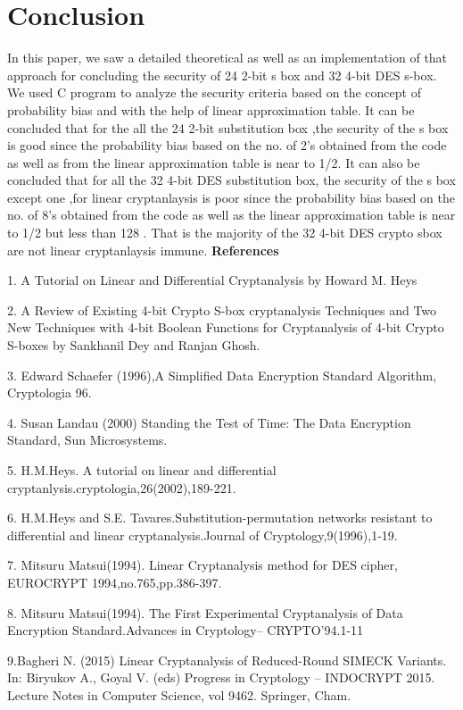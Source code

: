 \documentclass[12pt]{article}
\begin{document}
\section{Conclusion}
In this paper, we saw a detailed theoretical as well as an implementation of that approach for concluding the security of 24 2-bit s box and 32 4-bit DES s-box. We used C program to analyze the security criteria based on the concept of probability bias and with the help of linear approximation table. It can be concluded that for the all the 24 2-bit substitution box ,the security of the s box is good since the probability bias based on the no. of 2's obtained from the code as well as from the linear approximation table is near to 1/2. It can also be concluded that for all the 32 4-bit DES substitution box, the security of the s box except one ,for linear cryptanlaysis is poor since the probability bias based on the no. of 8's obtained from the code as well as the linear approximation table is near to 1/2 but less than 128 . That is the majority of the 32 4-bit DES crypto sbox are not linear cryptanlaysis immune.
\newpage
\textbf{\LARGE References}

1. A Tutorial on Linear and Differential Cryptanalysis by Howard M. Heys 

2. A Review of Existing 4-bit Crypto S-box cryptanalysis Techniques and Two New Techniques with 4-bit Boolean Functions for Cryptanalysis of 4-bit Crypto S-boxes by Sankhanil Dey and Ranjan Ghosh.

3. Edward Schaefer (1996),A Simplified Data Encryption Standard Algorithm, Cryptologia 96. 

4. Susan Landau (2000) Standing the Test of Time: The Data Encryption Standard, Sun Microsystems.

5. H.M.Heys. A tutorial on linear and differential cryptanlysis.cryptologia,26(2002),189-221.

6. H.M.Heys and S.E. Tavares.Substitution-permutation networks resistant to differential and linear cryptanalysis.Journal 
of Cryptology,9(1996),1-19.

7. Mitsuru Matsui(1994). Linear Cryptanalysis method for DES cipher, EUROCRYPT 1994,no.765,pp.386-397.

8. Mitsuru Matsui(1994). The First Experimental Cryptanalysis of Data Encryption Standard.Advances in Cryptology--
CRYPTO'94.1-11

9.Bagheri N. (2015) Linear Cryptanalysis of Reduced-Round SIMECK Variants. In: Biryukov A., Goyal V. (eds) Progress 
in Cryptology -- INDOCRYPT 2015. Lecture Notes in Computer Science,
vol 9462. Springer, Cham.
\end{document}
